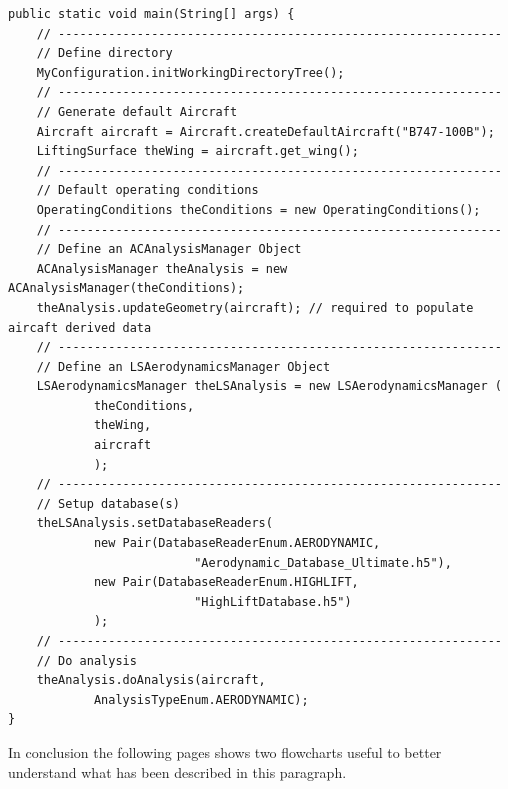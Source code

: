 \bigskip
\begin{lstlisting}[caption={Generation of default aircraft}, captionpos=b, tabsize=2]
public static void main(String[] args) {
	// --------------------------------------------------------------
	// Define directory
	MyConfiguration.initWorkingDirectoryTree();
	// --------------------------------------------------------------
	// Generate default Aircraft
	Aircraft aircraft = Aircraft.createDefaultAircraft("B747-100B");
	LiftingSurface theWing = aircraft.get_wing();
	// --------------------------------------------------------------
	// Default operating conditions
	OperatingConditions theConditions = new OperatingConditions();		
	// --------------------------------------------------------------
	// Define an ACAnalysisManager Object
	ACAnalysisManager theAnalysis = new ACAnalysisManager(theConditions);
	theAnalysis.updateGeometry(aircraft); // required to populate aircaft derived data
	// --------------------------------------------------------------
	// Define an LSAerodynamicsManager Object
	LSAerodynamicsManager theLSAnalysis = new LSAerodynamicsManager ( 
			theConditions,
			theWing,
			aircraft
			);
	// --------------------------------------------------------------
	// Setup database(s)		
	theLSAnalysis.setDatabaseReaders(
			new Pair(DatabaseReaderEnum.AERODYNAMIC,
                          "Aerodynamic_Database_Ultimate.h5"),
			new Pair(DatabaseReaderEnum.HIGHLIFT,  
                          "HighLiftDatabase.h5")
			);
	// --------------------------------------------------------------
	// Do analysis
	theAnalysis.doAnalysis(aircraft, 
			AnalysisTypeEnum.AERODYNAMIC);
}
\end{lstlisting}
%
In conclusion the following pages shows two flowcharts useful to better understand what has been described in this paragraph.
%
\begin{figure}[H]
\end{figure}
%
\begin{figure}[H]
\end{figure}
%
